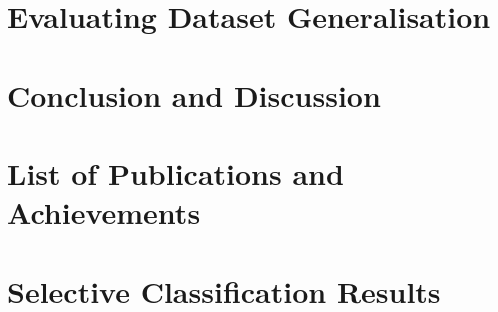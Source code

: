 \documentclass[12pt]{report}
\begin{document}
	
	\chapter{Evaluating Dataset Generalisation}
	\label{ch:dataset_generalisation}
	
	
	
	\chapter{Conclusion and Discussion}
	\label{ch:conclusion_and_discussion}
	
	
	
	
	\clearpage
	\renewcommand{\bibname}{References}
	
	
	
	\begin{appendices}
		\chapter{List of Publications and Achievements}
		\label{app:list_of_publications}
		
		
		\chapter{Selective Classification Results}
		\label{app:selective_classification_results}
		
	\end{appendices}
	
\end{document}
